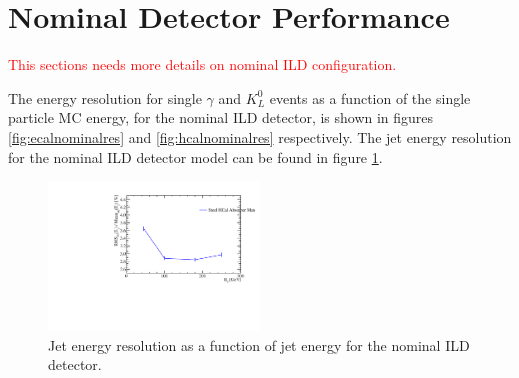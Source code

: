 
\section{Nominal Detector Performance}
\textcolor{red}{This sections needs more details on nominal ILD configuration.}

The energy resolution for single $\gamma$ and $K^{0}_{L}$ events as a function of the single particle MC energy, for the nominal ILD detector, is shown in figures \ref{fig:ecalnominalres} and \ref{fig:hcalnominalres} respectively.  The jet energy resolution for the nominal ILD detector model can be found in figure \ref{fig:jernominalres}. 

\begin{figure}
\centering
\includegraphics[width=0.5\textwidth]{OptimisationStudies/Plots/JetEnergyResolutions/JER_vs_JetEnergy_NominalDetectorPerformance.pdf}
\caption[Jet energy resolution as a function of jet energy for the nominal ILD detector.]{Jet energy resolution as a function of jet energy for the nominal ILD detector.}
\label{fig:jernominalres}
\end{figure} 

